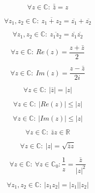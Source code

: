 \documentclass[main.tex]{subfiles}
\begin{document}
\begin{pr}
  \[ \forall z\in \mathbb{C}:\ \bar{\bar{z}} = z \]
\end{pr}

\begin{pr}
  \[ \forall z_{1},z_{2}\in \mathbb{C}:\ \overline{z_{1}+z_{2}} = \overline{z_{1}} + \overline{z_{2}} \]
\end{pr}

\begin{pr}
  \[ \forall z_{1},z_{2}\in \mathbb{C}:\ \overline{z_{1}z_{2}} = \overline{z_{1}}  \overline{z_{2}} \]
\end{pr}

\begin{pr}
  \[ \forall z\in \mathbb{C}:\ Re(z) = \frac{z+\bar{z}}{2} \]
\end{pr}

\begin{pr}
  \[ \forall z\in \mathbb{C}:\ Im(z) = \frac{z-\bar{z}}{2i} \]
\end{pr}

\begin{pr}
  \[ \forall z\in \mathbb{C}:\ |\bar{z}| = |z| \]
\end{pr}

\begin{pr}
  \[ \forall z\in \mathbb{C}:\ |Re(z)| \le |z| \]
\end{pr}

\begin{pr}
  \[ \forall z\in \mathbb{C}:\ |Im(z)| \le |z|\]
\end{pr}

\begin{pr}
  \[ \forall z\in \mathbb{C}:\ \bar{z}z\in \mathbb{R} \]
\end{pr}

\begin{pr}
  \[ \forall z\in \mathbb{C}:\ |z| = \sqrt{\bar{z}z} \]
\end{pr}

\begin{pr}
  \[ \forall z\in \mathbb{C}:\ \forall z \in \mathbb{C}_{0}: \frac{1}{z} = \frac{\bar{z}}{|z|^{2}} \]
\end{pr}

\begin{pr}
  \[ \forall z_{1},z_{2}\in \mathbb{C}:\ |z_{1}z_{2}| = |z_{1}||z_{2}| \]
\end{pr}
\end{document}
